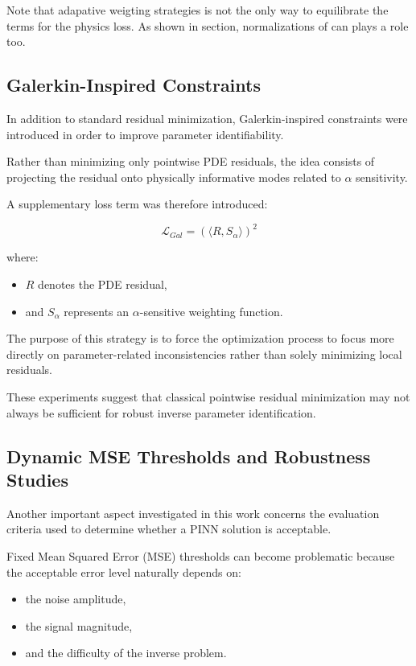 Note that adapative weigting strategies is not the only way to equilibrate the terms for the physics loss. As shown in section, normalizations of can plays a role too.

\subsection{Galerkin-Inspired Constraints}

In addition to standard residual minimization, Galerkin-inspired constraints were introduced in order to improve parameter identifiability.

Rather than minimizing only pointwise PDE residuals, the idea consists of projecting the residual onto physically informative modes related to $\alpha$ sensitivity.

A supplementary loss term was therefore introduced:

\begin{equation}
\mathcal{L}_{Gal}
=
\left(
\langle R,S_{\alpha}\rangle
\right)^2
\end{equation}

where:
\begin{itemize}
    \item $R$ denotes the PDE residual,
    \item and $S_{\alpha}$ represents an $\alpha$-sensitive weighting function.
\end{itemize}

The purpose of this strategy is to force the optimization process to focus more directly on parameter-related inconsistencies rather than solely minimizing local residuals.

These experiments suggest that classical pointwise residual minimization may not always be sufficient for robust inverse parameter identification.

\subsection{Dynamic MSE Thresholds and Robustness Studies}

Another important aspect investigated in this work concerns the evaluation criteria used to determine whether a PINN solution is acceptable.

Fixed Mean Squared Error (MSE) thresholds can become problematic because the acceptable error level naturally depends on:
\begin{itemize}
    \item the noise amplitude,
    \item the signal magnitude,
    \item and the difficulty of the inverse problem.
\end{itemize}

